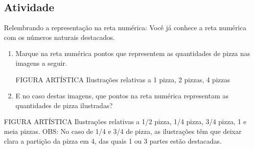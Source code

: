 \subsection{Atividade}

Relembrando a representação na reta numérica: Você já conhece a reta numérica com os números naturais destacados.


\begin{enumerate} [\quad a)] %
  \item     Marque na reta numérica pontos que representem as quantidades de pizza nas imagens a seguir. 

\begin{imagem*}[breakable]{}{}   FIGURA ARTÍSTICA 
Ilustrações relativas a 1 pizza, 2 pizzas, 4 pizzas
\end{imagem*}

\begin{center}
\end{center}

\item     E no caso destas imagens, que pontos na reta numérica representam as quantidades de pizza ilustradas?
\end{enumerate} %


\begin{imagem*}[breakable]{}{}   FIGURA ARTÍSTICA   \mbox{} \newline    Ilustrações relativas a 1/2 pizza,  1/4 pizza, 3/4 pizza, 1 e meia pizzas. OBS: No caso de 1/4 e 3/4 de pizza, as ilustrações têm que deixar clara a partição da pizza em 4, das quais 1 ou 3 partes estão destacadas.
  \end{imagem*}

  \begin{center}
\end{center}
  
